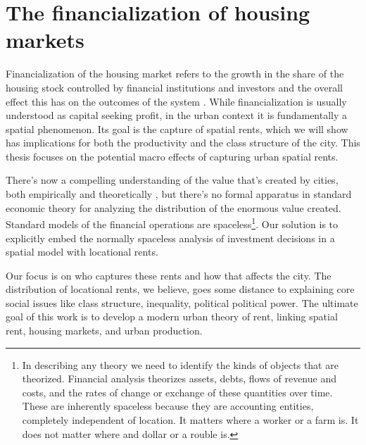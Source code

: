 \section{The financialization of housing markets}
Financialization of the housing market refers to the growth in the share of the housing stock controlled by financial institutions and investors and the overall effect this has on the outcomes of the system \cite{farhaReportFinancializationHousing2017, hansenFinanceCapitalismFinancialization2014}.
While financialization is usually understood as capital seeking profit, in the urban context it is fundamentally a spatial phenomenon. %
Its goal is the capture of spatial rents, which we will show has implications for both the productivity and the class structure of the city. 
This thesis focuses on the potential macro effects of capturing urban spatial rents. %

There's now a compelling understanding of the value that's created by cities, both empirically and theoretically \cite{jacobsEconomyCities1969, spenceUrbanizationGrowth2009, bettencourtIntroductionUrbanScience2021}, but there's no formal apparatus in standard economic theory for analyzing the distribution of the enormous value created. %
Standard models of the financial operations are spaceless\footnote{In describing any theory we need to identify the kinds of objects that are theorized. Financial analysis theorizes  assets, debts, flows of revenue and costs, and the rates of change or exchange of these quantities over time. These are inherently spaceless because they are accounting entities, completely independent of location. It matters where a worker or a farm is. It does not matter where and dollar or a rouble is.}. Our solution is to explicitly embed the normally spaceless analysis of investment decisions in a spatial model with locational rents. %

Our focus is on who captures these rents and how that affects the city. The distribution of locational rents, we believe, goes some distance to explaining core social issues like class structure, inequality, political political power. 
The ultimate goal of this work is to develop a modern urban theory of rent, linking spatial rent, housing markets, and urban production.


